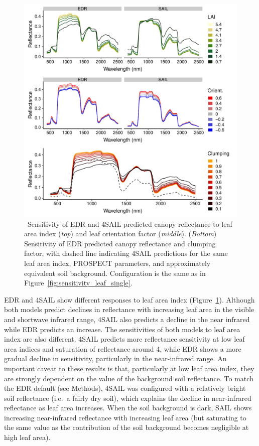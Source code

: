 \begin{figure}
  \centering
  \includegraphics[width=\textwidth]{4_edr/figures/explore_spectra/sensitivity_single_pft.pdf}
  \caption{\
    Sensitivity of EDR and 4SAIL predicted canopy reflectance to leaf area index (\textit{top}) and leaf orientation factor (\textit{middle}).
    (\textit{Bottom}) Sensitivity of EDR predicted canopy reflectance and clumping factor,
    with dashed line indicating 4SAIL predictions for the same leaf area index, PROSPECT parameters, and approximately equivalent soil background.
    Configuration is the same as in Figure~\ref{fig:sensitivity_leaf_single}.
  }\label{fig:sensitivity_structure_single}
\end{figure}

EDR and 4SAIL show different responses to leaf area index (Figure~\ref{fig:sensitivity_structure_single}).
Although both models predict declines in reflectance with increasing leaf area in the visible and shortwave infrared range,
4SAIL also predicts a decline in the near infrared while EDR predicts an increase.
The sensitivities of both models to leaf area index are also different.
4SAIL predicts more reflectance sensitivity at low leaf area indices and saturation of reflectance around 4, while EDR shows a more gradual decline in sensitivity, particularly in the near-infrared range. 
An important caveat to these results is that, particularly at low leaf area index, they are strongly dependent on the value of the background soil reflectance.
To match the EDR default (see Methods), 4SAIL was configured with a relatively bright soil reflectance (i.e.\ a fairly dry soil), which explains the decline in near-infrared reflectance as leaf area increases.
When the soil background is dark, SAIL shows increasing near-infrared reflectance with increasing leaf area (but saturating to the same value as the contribution of the soil background becomes negligible at high leaf area).

